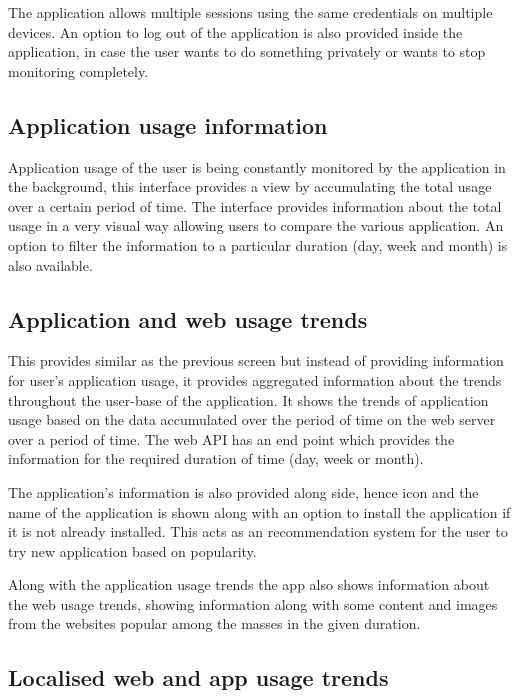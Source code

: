 \documentclass[12pt]{report}
\begin{document}
The application allows multiple sessions using the same credentials on multiple devices. An option to log out of the application is also provided inside the application, in case the user wants to do something privately or wants to stop monitoring completely.

\subsection{Application usage information}
\label{AppUsageInfo}

Application usage of the user is being constantly monitored by the application in the background, this interface provides a view by accumulating the total usage over a certain period of time. The interface provides information about the total usage in a very visual way allowing users to compare the various application. An option to filter the information to a particular duration (day, week and month) is also available.

\subsection{Application and web usage trends}

This provides similar as the previous screen but instead of providing information for user's application usage, it provides aggregated information about the trends throughout the user-base of the application. It shows the trends of application usage based on the data accumulated over the period of time on the web server over a period of time. The web API has an end point which provides the information for the required duration of time (day, week or month).

The application's information is also provided along side, hence icon and the name of the application is shown along with an option to install the application if it is not already installed. This acts as an recommendation system for the user to try new application based on popularity.

Along with the application usage trends the app also shows information about the web usage trends, showing information along with some content and images from the websites popular among the masses in the given duration.


\subsection{Localised web and app usage trends}
\end{document}
